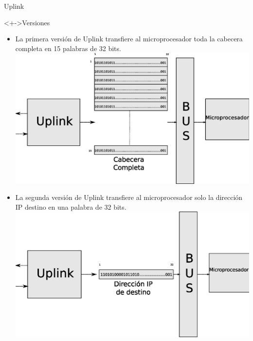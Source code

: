 \documentclass[xcolor=dvipsnames]{beamer}
\begin{document}
\begin{frame}{Uplink}
  \begin{block}<+->{Versiones}
	\begin{itemize}
      \scriptsize
	\item La primera versión de Uplink transfiere al microprocesador toda la cabecera completa en 15 palabras de 32 bits. 
	\center
	\includegraphics[scale=0.20]{figures/15pal.eps}  
	   \end{itemize}
	\begin{itemize}
      \scriptsize
	\item La segunda versión de Uplink transfiere al microprocesador solo la dirección IP destino en una palabra de 32 bits.
	\center
	\includegraphics[scale=0.20]{figures/1pal.eps}
   \end{itemize}
\end{block}
\end{frame}
\end{document}
